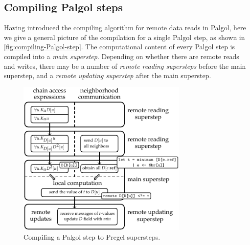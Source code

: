 \documentclass{sokendai_thesis} %
\begin{document}

\subsection{Compiling Palgol steps}
\label{sec:trans-step}

Having introduced the compiling algorithm for remote data reads in Palgol, here we give a general picture of the compilation for a single Palgol step, as shown in \autoref{fig:compiling-Palgol-step}.
The computational content of every Palgol step is compiled into a \emph{main superstep}.
Depending on whether there are remote reads and writes, there may be a number of \emph{remote reading supersteps} before the main superstep, and a \emph{remote updating superstep} after the main superstep.

\begin{figure}[t]
 \centering
 \includegraphics[width=0.75\textwidth]{figures/compile.pdf}
 \vspace{-2ex}
 \caption{Compiling a Palgol step to Pregel supersteps.}
 \label{fig:compiling-Palgol-step}
\end{figure}
\end{document}
